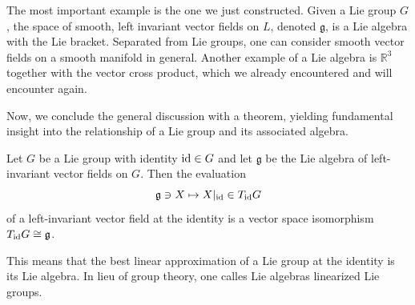 \begin{eg}
    The most important example is the one we just constructed. Given a Lie group $G$, the space of smooth, left invariant vector fields on $L$, denoted $\mathfrak{g}$, is a Lie algebra with the Lie bracket.
    Separated from Lie groups, one can consider smooth vector fields on a smooth manifold in general. Another example of a Lie algebra is $\mathbb{R}^3$ together with the vector cross product, which we already encountered and will encounter again.
\end{eg}
Now, we conclude the general discussion with a theorem, yielding fundamental insight into the relationship of a Lie group and its associated algebra.
\begin{theorem}
    Let $G$ be a Lie group with identity $\operatorname{id} \in G$ and let $\mathfrak{g}$ be the Lie algebra of left-invariant vector fields on $G$. Then the evaluation \[
        \mathfrak{g} \ni X \mapsto X|_{\operatorname{id}} \in T_{\operatorname{id}}G
    \] of a left-invariant vector field at the identity is a vector space isomorphism $T_{\operatorname{id}} G  \cong \mathfrak{g}$.
\end{theorem}
This means that the best linear approximation of a Lie group at the identity is its Lie algebra. In lieu of group theory, one calles Lie algebras linearized Lie groups.
